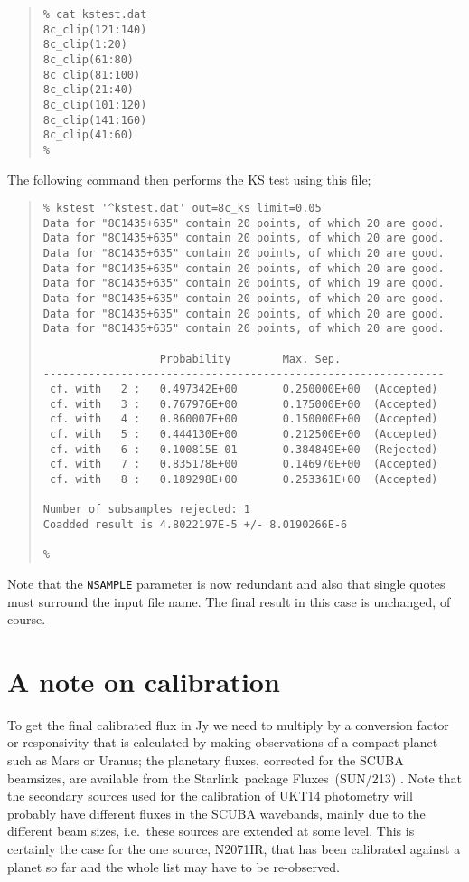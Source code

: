 \documentclass[twoside,11pt,fleqn]{article}
\newenvironment{myquote}{\begin{quote}\begin{small}}{\end{small}\end{quote}}
\newcommand{\starlink}{\htmladdnormallink{Starlink}{http://www.starlink.ac.uk/}}
\newcommand{\fluxes}{\xref{{\sc Fluxes}}{sun213}{}}
\newcommand{\param}[1]{{\tt #1}}
\newcommand{\htmladdnormallink}[2]{#1}
\newcommand{\xref}[3]{#1}
\begin{document}
\begin{myquote}
\begin{verbatim}
% cat kstest.dat
8c_clip(121:140)
8c_clip(1:20)
8c_clip(61:80)
8c_clip(81:100)
8c_clip(21:40)
8c_clip(101:120)
8c_clip(141:160)
8c_clip(41:60)
%
\end{verbatim}
\end{myquote}

The following command then performs the KS test using this file;

\begin{myquote}
\begin{verbatim}
% kstest '^kstest.dat' out=8c_ks limit=0.05
Data for "8C1435+635" contain 20 points, of which 20 are good.
Data for "8C1435+635" contain 20 points, of which 20 are good.
Data for "8C1435+635" contain 20 points, of which 20 are good.
Data for "8C1435+635" contain 20 points, of which 20 are good.
Data for "8C1435+635" contain 20 points, of which 19 are good.
Data for "8C1435+635" contain 20 points, of which 20 are good.
Data for "8C1435+635" contain 20 points, of which 20 are good.
Data for "8C1435+635" contain 20 points, of which 20 are good.

                  Probability        Max. Sep.
--------------------------------------------------------------
 cf. with   2 :   0.497342E+00       0.250000E+00  (Accepted)
 cf. with   3 :   0.767976E+00       0.175000E+00  (Accepted)
 cf. with   4 :   0.860007E+00       0.150000E+00  (Accepted)
 cf. with   5 :   0.444130E+00       0.212500E+00  (Accepted)
 cf. with   6 :   0.100815E-01       0.384849E+00  (Rejected)
 cf. with   7 :   0.835178E+00       0.146970E+00  (Accepted)
 cf. with   8 :   0.189298E+00       0.253361E+00  (Accepted)

Number of subsamples rejected: 1
Coadded result is 4.8022197E-5 +/- 8.0190266E-6

%
\end{verbatim}
\end{myquote}
Note that the \param{NSAMPLE} parameter is now redundant and also that single
quotes must surround the input file name. The final result in this case
is unchanged, of course.

\section{A note on calibration}

To get the final calibrated flux in Jy we need to multiply by a conversion
factor or responsivity that is calculated by making observations of a compact
planet such as Mars or Uranus; the planetary fluxes, corrected for the SCUBA
beamsizes, are available from the \starlink\ package \fluxes\
(\xref{SUN/213}{sun213}{}) \cite{fluxes}. Note that the secondary sources used
for the calibration of UKT14 photometry \cite{uktphot} will probably have
different fluxes in the SCUBA wavebands, mainly due to the different beam
sizes, i.e.\ these sources are extended at some level. This is certainly the
case for the one source, N2071IR, that has been calibrated against a planet so
far and the whole list may have to be re-observed.
\end{document}
